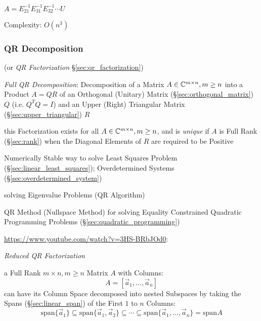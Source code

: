 $A = E_{21}^{-1}E_{31}^{-1}E_{32}^{-1}\cdots U$

Complexity: $O(n^3)$



\subsubsection{QR Decomposition}\label{sec:qr_decomposition}

(or \emph{QR Factorization} \S\ref{sec:qr_factorization})

\emph{Full QR Decomposition}: Decomposition of a Matrix $A \in \mathbb{C}^{m \times
  n}, m \geq n$ into a Product $A = QR$ of an Orthogonal (Unitary) Matrix
(\S\ref{sec:orthogonal_matrix}) $Q$ (i.e. $Q^TQ = I$) and an Upper (Right)
Triangular Matrix (\S\ref{sec:upper_triangular}) $R$

this Factorization exists for all $A \in \mathbb{C}^{m \times n}, m \geq n$, and is
\emph{unique} if $A$ is Full Rank (\S\ref{sec:rank}) when the Diagonal Elements
of $R$ are required to be Positive

Numerically Stable way to solve Least Squares Problem
(\S\ref{sec:linear_least_squares}); Overdetermined Systems
(\S\ref{sec:overdetermined_system})

solving Eigenvalue Problems (QR Algorithm)

\fist QR Method (Nullspace Method) for solving Equality Constrained Quadratic
Programming Problems (\S\ref{sec:quadratic_programming})


\url{https://www.youtube.com/watch?v=3HS-BRbJOd0}:

\emph{Reduced QR Factorization}

a Full Rank $m \times n, m \geq n$ Matrix $A$ with Columns:
\[
  A = [ \vec{a}_1, \ldots, \vec{a}_n ]
\]
can have its Column Space decomposed into nested Subspaces by taking the Spans
(\S\ref{sec:linear_span}) of the First $1$ to $n$ Columns:
\[
  \mathrm{span} \{ \vec{a}_1 \} \subseteq
  \mathrm{span} \{ \vec{a}_1, \vec{a}_2 \}
  \subseteq \cdots \subseteq
  \mathrm{span} \{ \vec{a}_1, \ldots, \vec{a}_n \}
  = \mathrm{span} A
\]

